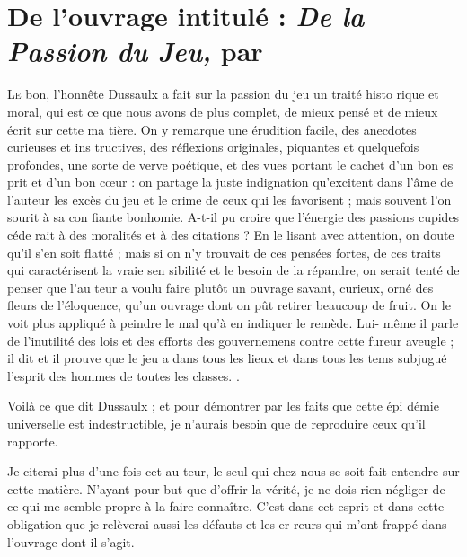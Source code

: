 \chapter
  [De l'ouvrage intitulé : \emph{de la Passion du Jeu,} par Dussaulx]
  {De l'ouvrage intitulé : \emph{De la Passion du Jeu,} par }

\lettrine{L}{e} bon, l'honnête Dussaulx a fait
sur la passion du jeu un traité histo%
rique et moral, qui est ce que nous
avons de plus complet, de mieux
pensé et de mieux écrit sur cette ma%
tière. On y remarque une érudition
facile, des anecdotes curieuses et ins%
tructives, des réflexions originales,
piquantes et quelquefois profondes,
une sorte de verve poétique, et des
vues portant le cachet d'un bon es%
prit et d'un bon cœur : on partage
la juste indignation qu'excitent dans
l'âme de l'auteur les excès du jeu et
le crime de ceux qui les favorisent ;
mais souvent l'on sourit à sa con%
fiante bonhomie. A-t-il pu croire que
l'énergie des passions cupides céde%
rait à des moralités et à des citations ?
En le lisant avec attention, on doute
qu'il s'en soit flatté ; mais si on n'y
trouvait de ces pensées fortes, de ces
traits qui caractérisent la vraie sen%
sibilité et le besoin de la répandre,
on serait tenté de penser que l'au%
teur a voulu faire plutôt un ouvrage
savant, curieux, orné des fleurs de
l'éloquence, qu'un ouvrage dont on
pût retirer beaucoup de fruit. On le
voit plus appliqué à peindre le mal
qu'à en indiquer le remède. Lui-%
même il parle de l'inutilité des lois et
des efforts des gouvernemens contre
cette fureur aveugle ; il dit et il prouve
que le jeu a dans tous les lieux et dans
tous les tems subjugué l'esprit des
hommes de toutes les classes. .

Voilà ce que dit Dussaulx ; et pour
démontrer par les faits que cette épi%
démie universelle est indestructible,
je n'aurais besoin que de reproduire
ceux qu'il rapporte.

Je citerai plus d'une fois cet au%
teur, le seul qui chez nous se soit fait
entendre sur cette matière. N'ayant
pour but que d'offrir la vérité, je ne
dois rien négliger de ce qui me semble
propre à la faire connaître. C'est dans
cet esprit et dans cette obligation que
je relèverai aussi les défauts et les er%
reurs qui m'ont frappé dans l'ouvrage
dont il s'agit.

